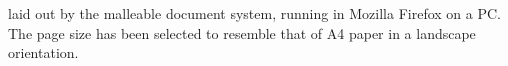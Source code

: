 \begin{center}
\end{center}


\clearpage


\cite{Pinkney2011} laid out by the malleable document system, running in Mozilla Firefox on a PC. The page size has been selected to resemble that of A4 paper in a landscape orientation.

